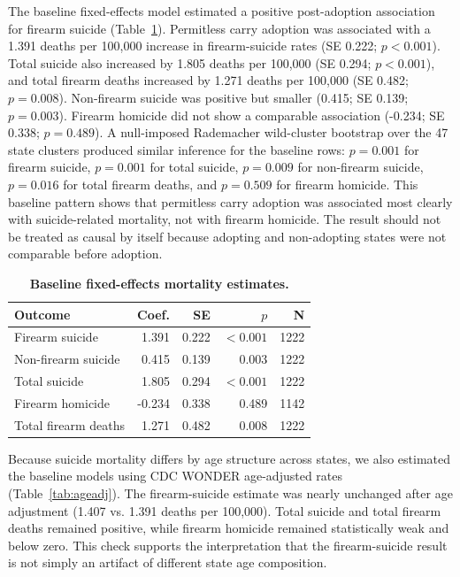 \documentclass[11pt]{article}
\begin{document}
The baseline fixed-effects model estimated a positive post-adoption association for firearm suicide (Table~\ref{tab:main}). Permitless carry adoption was associated with a 1.391 deaths per 100,000 increase in firearm-suicide rates (SE 0.222; $p<0.001$). Total suicide also increased by 1.805 deaths per 100,000 (SE 0.294; $p<0.001$), and total firearm deaths increased by 1.271 deaths per 100,000 (SE 0.482; $p=0.008$). Non-firearm suicide was positive but smaller (0.415; SE 0.139; $p=0.003$). Firearm homicide did not show a comparable association (-0.234; SE 0.338; $p=0.489$). A null-imposed Rademacher wild-cluster bootstrap over the 47 state clusters produced similar inference for the baseline rows: $p=0.001$ for firearm suicide, $p=0.001$ for total suicide, $p=0.009$ for non-firearm suicide, $p=0.016$ for total firearm deaths, and $p=0.509$ for firearm homicide. This baseline pattern shows that permitless carry adoption was associated most clearly with suicide-related mortality, not with firearm homicide. The result should not be treated as causal by itself because adopting and non-adopting states were not comparable before adoption.

\begin{table}[H]
\centering
\caption{\textbf{Baseline fixed-effects mortality estimates.}}
\label{tab:main}
\begin{tabular}{lrrrr}
\toprule
Outcome & Coef. & SE & $p$ & N \\
\midrule
Firearm suicide & 1.391 & 0.222 & $<0.001$ & 1222 \\
Non-firearm suicide & 0.415 & 0.139 & 0.003 & 1222 \\
Total suicide & 1.805 & 0.294 & $<0.001$ & 1222 \\
Firearm homicide & -0.234 & 0.338 & 0.489 & 1142 \\
Total firearm deaths & 1.271 & 0.482 & 0.008 & 1222 \\
\bottomrule
\end{tabular}
\end{table}

Because suicide mortality differs by age structure across states, we also estimated the baseline models using CDC WONDER age-adjusted rates (Table~\ref{tab:ageadj}). The firearm-suicide estimate was nearly unchanged after age adjustment (1.407 vs. 1.391 deaths per 100,000). Total suicide and total firearm deaths remained positive, while firearm homicide remained statistically weak and below zero. This check supports the interpretation that the firearm-suicide result is not simply an artifact of different state age composition.
\end{document}
